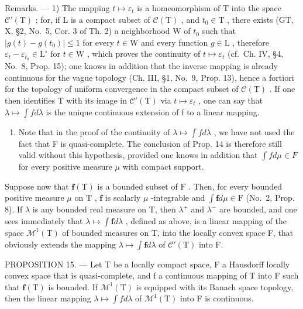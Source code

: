 Remarks. --- 1) The mapping \(t \mapsto \varepsilon_t\) is a homeomorphism of T into the space \(\mathcal{C}'(\mathrm{T})\) ; for, if L is a compact subset of \(\mathcal{C}(\mathrm{T})\) , and \(t_0 \in \mathrm{T}\) , there exists (GT, X, §2, No.~5, Cor. 3 of Th. 2) a neighborhood W of \(t_0\) such that \(|g(t) - g(t_0)| \leqslant 1\) for every \(t \in \mathrm{W}\) and every function \(g \in \mathrm{L}\) , therefore \(\varepsilon_t - \varepsilon_{t_0} \in \mathrm{L}^\circ\) for \(t \in \mathrm{W}\) , which proves the continuity of \(t \mapsto \varepsilon_t\) (cf.~Ch. IV, §4, No.~8, Prop. 15); one knows in addition that the inverse mapping is already continuous for the vague topology (Ch. III, §1, No.~9, Prop. 13), hence a fortiori for the topology of uniform convergence in the compact subset of \(\mathcal{C}(\mathrm{T})\) . If one then identifies T with its image in \(\mathcal{C}'(\mathrm{T})\) via \(t \mapsto \varepsilon_t\) , one can say that \(\lambda \mapsto \int f d\lambda\) is the unique continuous extension of f to a linear mapping.

\begin{enumerate}
\def\labelenumi{\arabic{enumi})}
\setcounter{enumi}{1}
\tightlist
\item
  Note that in the proof of the continuity of \(\lambda\mapsto\int f d\lambda\) , we have not used the fact that F is quasi-complete. The conclusion of Prop. 14 is therefore still valid without this hypothesis, provided one knows in addition that \(\int f d\mu\in F\) for every positive measure \(\mu\) with compact support.
\end{enumerate}

Suppose now that \(\mathbf{f}(\mathrm{T})\) is a bounded subset of \(\mathrm{F}\) . Then, for every bounded positive measure \(\mu\) on \(\mathrm{T}\) , \(\mathbf{f}\) is scalarly \(\mu\) -integrable and \(\int \mathbf{f}d\mu \in \mathrm{F}\) (No.~2, Prop. 8). If \(\lambda\) is any bounded real measure on T, then \(\lambda^{+}\) and \(\lambda^{-}\) are bounded, and one sees immediately that \(\lambda \mapsto \int \mathbf{f} d\lambda\) , defined as above, is a linear mapping of the space \(\mathcal{M}^1(\mathrm{T})\) of bounded measures on T, into the locally convex space F, that obviously extends the mapping \(\lambda \mapsto \int \mathbf{f} d\lambda\) of \(\mathcal{C}'(\mathrm{T})\) into F.

PROPOSITION 15. --- Let T be a locally compact space, F a Hausdorff locally convex space that is quasi-complete, and f a continuous mapping of T into F such that \(\mathbf{f}(\mathrm{T})\) is bounded. If \(\mathcal{M}^{1}(\mathrm{T})\) is equipped with its Banach space topology, then the linear mapping \(\lambda \mapsto \int f d\lambda\) of \(\mathcal{M}^{1}(\mathrm{T})\) into F is continuous.

